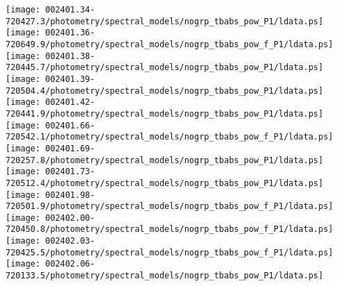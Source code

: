 \documentclass{aastex}
\begin{document}
\begin{figure*}[!ht]
\centering
\texttt{[image: 002401.34-720427.3/photometry/spectral\_models/nogrp\_tbabs\_pow\_P1/ldata.ps]} \hfill 
\texttt{[image: 002401.36-720649.9/photometry/spectral\_models/nogrp\_tbabs\_pow\_f\_P1/ldata.ps]} \hfill 
\texttt{[image: 002401.38-720445.7/photometry/spectral\_models/nogrp\_tbabs\_pow\_P1/ldata.ps]} \\ 
\vspace*{0.5in}
\texttt{[image: 002401.39-720504.4/photometry/spectral\_models/nogrp\_tbabs\_pow\_P1/ldata.ps]} \hfill 
\texttt{[image: 002401.42-720441.9/photometry/spectral\_models/nogrp\_tbabs\_pow\_P1/ldata.ps]} \hfill 
\texttt{[image: 002401.66-720542.1/photometry/spectral\_models/nogrp\_tbabs\_pow\_f\_P1/ldata.ps]} \\ 
\vspace*{0.5in}
\texttt{[image: 002401.69-720257.8/photometry/spectral\_models/nogrp\_tbabs\_pow\_P1/ldata.ps]} \hfill 
\texttt{[image: 002401.73-720512.4/photometry/spectral\_models/nogrp\_tbabs\_pow\_P1/ldata.ps]} \hfill 
\texttt{[image: 002401.98-720501.9/photometry/spectral\_models/nogrp\_tbabs\_pow\_f\_P1/ldata.ps]} \\ 
\vspace*{0.5in}
\texttt{[image: 002402.00-720450.8/photometry/spectral\_models/nogrp\_tbabs\_pow\_f\_P1/ldata.ps]} \hfill 
\texttt{[image: 002402.03-720425.5/photometry/spectral\_models/nogrp\_tbabs\_pow\_f\_P1/ldata.ps]} \hfill 
\texttt{[image: 002402.06-720133.5/photometry/spectral\_models/nogrp\_tbabs\_pow\_P1/ldata.ps]} \\ 
\vspace*{0.5in}
\end{figure*}
\clearpage
\end{document}
